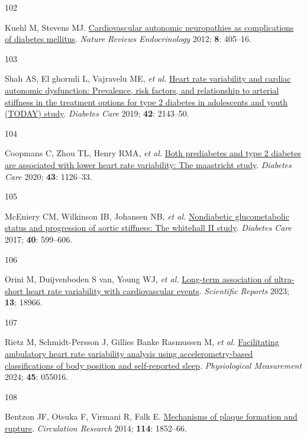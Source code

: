 \documentclass[
  letterpaper,
  headsepline=true,
  open=any]{scrbook}
\newlength{\cslhangindent}
\newlength{\csllabelwidth}
\newlength{\cslentryspacingunit} %
\newenvironment{CSLReferences}[2] %
 {%
  \setlength{\parindent}{0pt}
  \ifodd #1
  \let\oldpar\par
  \def\par{\hangindent=\cslhangindent\oldpar}
  \fi
  \setlength{\parskip}{#2\cslentryspacingunit}
 }%
 {}
\newcommand{\CSLLeftMargin}[1]{\parbox[t]{\csllabelwidth}{#1}}
\newcommand{\CSLRightInline}[1]{\parbox[t]{\linewidth - \csllabelwidth}{#1}\break}
\begin{document}
\begin{CSLReferences}{0}{0}
\leavevmode{}%
\CSLLeftMargin{102 }%
\CSLRightInline{Kuehl M, Stevens MJ.
\href{https://doi.org/10.1038/nrendo.2012.21}{Cardiovascular autonomic
neuropathies as complications of diabetes mellitus}. \emph{Nature
Reviews Endocrinology} 2012; \textbf{8}: 405--16.}

\leavevmode{}%
\CSLLeftMargin{103 }%
\CSLRightInline{Shah AS, El ghormli L, Vajravelu ME, \emph{et al.}
\href{https://doi.org/10.2337/dc19-0993}{Heart rate variability and
cardiac autonomic dysfunction: Prevalence, risk factors, and
relationship to arterial stiffness in the treatment options for type 2
diabetes in adolescents and youth (TODAY) study}. \emph{Diabetes Care}
2019; \textbf{42}: 2143--50.}

\leavevmode{}%
\CSLLeftMargin{104 }%
\CSLRightInline{Coopmans C, Zhou TL, Henry RMA, \emph{et al.}
\href{https://doi.org/10.2337/dc19-2367}{Both prediabetes and type 2
diabetes are associated with lower heart rate variability: The
maastricht study}. \emph{Diabetes Care} 2020; \textbf{43}: 1126--33.}

\leavevmode{}%
\CSLLeftMargin{105 }%
\CSLRightInline{McEniery CM, Wilkinson IB, Johansen NB, \emph{et al.}
\href{https://doi.org/10.2337/dc16-1773}{Nondiabetic glucometabolic
status and progression of aortic stiffness: The whitehall II study}.
\emph{Diabetes Care} 2017; \textbf{40}: 599--606.}

\leavevmode{}%
\CSLLeftMargin{106 }%
\CSLRightInline{Orini M, Duijvenboden S van, Young WJ, \emph{et al.}
\href{https://doi.org/10.1038/s41598-023-45988-2}{Long-term association
of ultra-short heart rate variability with cardiovascular events}.
\emph{Scientific Reports} 2023; \textbf{13}: 18966.}

\leavevmode{}%
\CSLLeftMargin{107 }%
\CSLRightInline{Rietz M, Schmidt-Persson J, Gillies Banke Rasmussen M,
\emph{et al.}
\href{https://doi.org/10.1088/1361-6579/ad450d}{Facilitating ambulatory
heart rate variability analysis using accelerometry-based
classifications of body position and self-reported sleep}.
\emph{Physiological Measurement} 2024; \textbf{45}: 055016.}

\leavevmode{}%
\CSLLeftMargin{108 }%
\CSLRightInline{Bentzon JF, Otsuka F, Virmani R, Falk E.
\href{https://doi.org/10.1161/CIRCRESAHA.114.302721}{Mechanisms of
plaque formation and rupture}. \emph{Circulation Research} 2014;
\textbf{114}: 1852--66.}


\end{CSLReferences}
\end{document}
